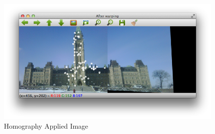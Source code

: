 \documentclass{article}
\begin{document}
\begin{figure}[H]
\begin{center}
\includegraphics[scale=0.5]{toolboxHomography.png}
\caption{Homography Applied Image}
\end{center}
\end{figure}	   
\end{document}

